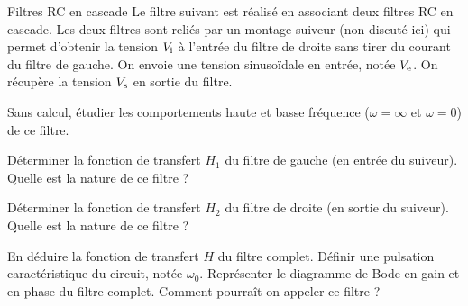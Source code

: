\begin{exo}[MPSI]{Filtres RC en cascade}
Le filtre suivant est réalisé en associant deux filtres RC en cascade. Les deux filtres sont reliés par un montage suiveur (non discuté ici) qui permet d'obtenir la tension $V_{\rm i}$ à l'entrée du filtre de droite sans tirer du courant du filtre de gauche. On envoie une tension sinusoïdale en entrée, notée $V_{ \rm e}$. On récupère la tension $V_{\rm s}$ en sortie du filtre.

\begin{center}

\end{center}

\begin{quest}
\item Sans calcul, étudier les comportements haute et basse fréquence ($\omega=\infty$ et $\omega=0$) de ce filtre.



\item Déterminer la fonction de transfert $H_1$ du filtre de gauche (en entrée du suiveur). Quelle est la nature de ce filtre ?


\item Déterminer la fonction de transfert $H_2$ du filtre de droite (en sortie du suiveur). Quelle est la nature de ce filtre ?


\item En déduire la fonction de transfert $H$ du filtre complet. Définir une pulsation caractéristique du circuit, notée $\omega_0$. Représenter le diagramme de Bode en gain et en phase du filtre complet. Comment pourraît-on appeler ce filtre ?


\end{quest}
\end{exo}

